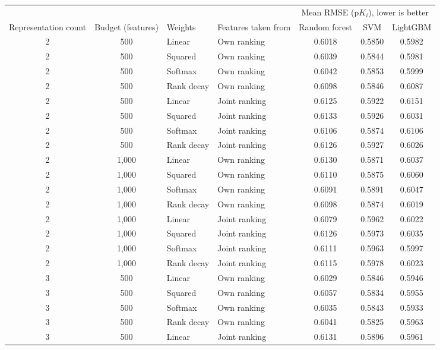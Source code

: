 \begin{table}[htbp]
\centering
\small
\begin{tabular}{@{}ccllccc@{}}
\toprule
 & & & & \multicolumn{3}{c}{Mean RMSE (p$K_i$), lower is better} \\
\cmidrule(l){5-7}
Representation count & Budget (features) & Weights & Features taken from & Random forest & SVM & LightGBM \\
\midrule
2 & 500 & Linear & Own ranking & 0.6018 & 0.5850 & 0.5982 \\
2 & 500 & Squared & Own ranking & 0.6039 & 0.5844 & 0.5981 \\
2 & 500 & Softmax & Own ranking & 0.6042 & 0.5853 & 0.5999 \\
2 & 500 & Rank decay & Own ranking & 0.6098 & 0.5846 & 0.6087 \\
2 & 500 & Linear & Joint ranking & 0.6125 & 0.5922 & 0.6151 \\
2 & 500 & Squared & Joint ranking & 0.6133 & 0.5926 & 0.6031 \\
2 & 500 & Softmax & Joint ranking & 0.6106 & 0.5874 & 0.6106 \\
2 & 500 & Rank decay & Joint ranking & 0.6126 & 0.5927 & 0.6026 \\
2 & 1,000 & Linear & Own ranking & 0.6130 & 0.5871 & 0.6037 \\
2 & 1,000 & Squared & Own ranking & 0.6110 & 0.5875 & 0.6060 \\
2 & 1,000 & Softmax & Own ranking & 0.6091 & 0.5891 & 0.6047 \\
2 & 1,000 & Rank decay & Own ranking & 0.6098 & 0.5874 & 0.6019 \\
2 & 1,000 & Linear & Joint ranking & 0.6079 & 0.5962 & 0.6022 \\
2 & 1,000 & Squared & Joint ranking & 0.6126 & 0.5973 & 0.6035 \\
2 & 1,000 & Softmax & Joint ranking & 0.6111 & 0.5963 & 0.5997 \\
2 & 1,000 & Rank decay & Joint ranking & 0.6115 & 0.5978 & 0.6023 \\
\midrule
3 & 500 & Linear & Own ranking & 0.6029 & 0.5846 & 0.5946 \\
3 & 500 & Squared & Own ranking & 0.6057 & 0.5834 & 0.5955 \\
3 & 500 & Softmax & Own ranking & 0.6035 & 0.5843 & 0.5933 \\
3 & 500 & Rank decay & Own ranking & 0.6041 & 0.5825 & 0.5963 \\
3 & 500 & Linear & Joint ranking & 0.6131 & 0.5896 & 0.5961 \\

\end{tabular}
\end{table}
